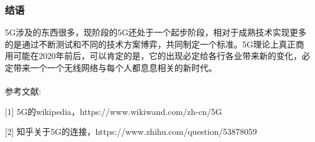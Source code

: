 \documentclass[a4paper,10pt]{ctexart}
\begin{document}
\subsubsection*{结语}

  5G涉及的东西很多，现阶段的5G还处于一个起步阶段，相对于成熟技术实现更多的是通过不断测试和不同的技术方案博弈，共同制定一个标准。5G理论上真正商用可能在2020年前后，可以肯定的是，它的出现必定给各行各业带来新的变化，必定带来一个一个无线网络与每个人都息息相关的新时代。\\ \\ 参考文献:


[1] 5G的wikipedia，https://www.wikiwand.com/zh-cn/5G

[2] 知乎关于5G的连接，https://www.zhihu.com/question/53878059
\end{document}
